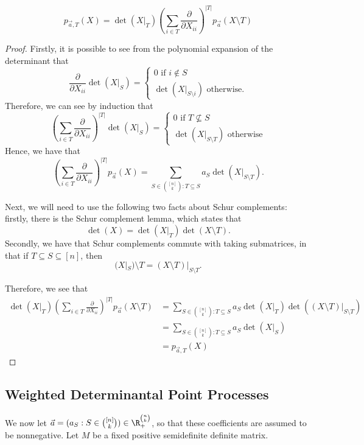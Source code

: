 \begin{lemma}\label{lem:poly_cond}
\[
    p_{\vec{a}, T}(X) = \det(X|_T) \left( \sum_{i \in T} \frac{\partial}{\partial X_{ii}} \right)^{|T|}p_{\vec{a}}(X \setminus T) 
\]
\end{lemma}
\begin{proof}
    Firstly, it is possible to see from the polynomial expansion of the determinant that
    \[
        \frac{\partial}{\partial X_{ii}}\det(X|_S) = 
        \begin{cases}
            0 \text{ if }i \not \in S\\
            \det(X|_{S \setminus i}) \text{ otherwise}.            
        \end{cases}
    \]
    Therefore, we can see by induction that 
    \[
        \left( \sum_{i \in T} \frac{\partial}{\partial X_{ii}} \right)^{|T|}\det(X|_S) = 
        \begin{cases}
            0 \text{ if }T\not \subseteq S\\
            \det(X|_{S \setminus T}) \text{ otherwise}
        \end{cases}
    \]
    Hence, we have that 
    \[
        \left( \sum_{i \in T} \frac{\partial}{\partial X_{ii}} \right)^{|T|}p_{\vec{a}}(X) = \sum_{S \in \binom{[n]}{k} : T \subseteq S}
        a_S \det(X|_{S \setminus T}).
    \]

    Next, we will need to use the following two facts about Schur complements: 
    firstly, there is the Schur complement lemma, which states that
    \[
        \det(X) = \det(X|_T) \det(X \setminus T).
    \]
    Secondly, we have that Schur complements commute with taking submatrices, in that if $T \subseteq S \subseteq [n]$, then
    \[
        (X|_S) \setminus T = (X \setminus T)|_{S \setminus T}.
    \]

    Therefore, we see that 
    \begin{align*}
        \det(X|_T)\left( \sum_{i \in T} \frac{\partial}{\partial X_{ii}} \right)^{|T|}p_{\vec{a}}(X \setminus T)
        &= \sum_{S \in \binom{[n]}{k} : T \subseteq S}
        a_S \det(X|_T)\det((X\setminus T)|_{S \setminus T})\\
        &= \sum_{S \in \binom{[n]}{k} : T \subseteq S} a_S \det(X|_S)\\
        &= p_{\vec{a}, T}(X)
    \end{align*}

    
\end{proof}


\subsection{Weighted Determinantal Point Processes}
We now let $\vec{a} = (a_S : S \in \binom{[n]}{k}) \in \R_+^{\binom{n}{k}}$, so that these coefficients are assumed to be nonnegative.
Let $M$ be a fixed positive semidefinite definite matrix.

